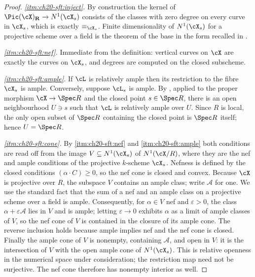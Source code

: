 \begin{proof}
\emph{\cref{itm:ch20-sft:inject}.}  By construction the kernel of
$\Pic(\cX)_{\mathbf R}\to N^1(\cX_s)$ consists of the classes with zero
degree on every curve in $\cX_s$, which is exactly $\equiv_{\cX_s}$.
Finite dimensionality of $N^1(\cX_s)$ for a projective scheme over a field
is the theorem of the base in the form recalled in
.

\emph{\cref{itm:ch20-sft:nef}.}  Immediate from the definition: vertical
curves on $\cX$ are exactly the curves on $\cX_s$, and degrees are
computed on the closed subscheme.

\emph{\cref{itm:ch20-sft:ample}.}  If $\cL$ is relatively ample then its
restriction to the fibre $\cX_s$ is ample.  Conversely, suppose
$\cL_s$ is ample.  By \cite[4.7.1]{EGAIII1}, applied to the proper
morphism $\cX\to\Spec R$ and the closed point $s\in\Spec R$, there is an
open neighbourhood $U\ni s$ such that $\cL$ is relatively ample over
$U$.  Since $R$ is local, the only open subset of $\Spec R$ containing
the closed point is $\Spec R$ itself; hence $U=\Spec R$.

\emph{\cref{itm:ch20-sft:cone}.}  By \cref{itm:ch20-sft:nef} and
\cref{itm:ch20-sft:ample} both conditions are read off from the image
$V\subseteq N^1(\cX_s)$ of $N^1(\cX/R)$, where they are the nef and
ample conditions of the projective $k$-scheme $\cX_s$.  Nefness is
defined by the closed conditions $(\alpha\cdot C)\geq0$, so the nef cone
is closed and convex.  Because $\cX$ is projective over $R$, the
subspace $V$ contains an ample class; write $\mathcal A$ for one.  We
use the standard fact that the sum of a nef and an ample class on a
projective scheme over a field is ample.  Consequently, for $\alpha\in V$
nef and $\varepsilon>0$, the class $\alpha+\varepsilon\mathcal A$ lies in
$V$ and is ample; letting $\varepsilon\to0$ exhibits $\alpha$ as a
limit of ample classes of $V$, so the nef cone of $V$ is contained in the
closure of its ample cone.  The reverse inclusion holds because ample
implies nef and the nef cone is closed.  Finally the ample cone of $V$ is
nonempty, containing $\mathcal A$, and open in $V$: it is the
intersection of $V$ with the open ample cone of
$N^1(\cX_s)$.  This is relative openness in the numerical space under
consideration; the restriction map need not be surjective.  The nef cone
therefore has nonempty interior as well.
\end{proof}

